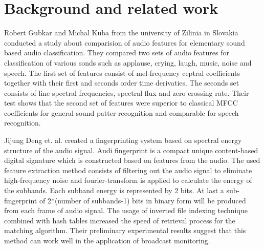 \section{Background and related work}
Robert Gubkar and Michal Kuba \cite{6566278}  from the university of Zilinia in Slovakia
conducted a study about comparision of audio features for elementary sound
based audio classification. They compared two sets of audio features for classification
of various sonds such as applause, crying, laugh, music, noise and speech.
The first set of features consist of mel-frequency ceptral coefficients together with
their first and seconds order time derivaties. The seconds set consists of line
spectral frequencies, spectral flux and zero crossing rate. Their test shows that
the second set of features were superior to classical MFCC coefficients for general
sound patter recognition and comparable for speech recognition.

Jijung Deng et. al.\cite{6138136} created a fingerprinting system based on spectral energy
structure of the audio signal. Audi fingerprint is a compact unique content-based
digital signature which is constructed based on features from the audio.
The used feature extraction method consists of filtering out the audio signal
to eliminate high-frequency noise and fourier-transform is applied to calculate
the energy of the subbands. Each subband energy is represented by 2 bits.
At last a sub-fingerprint of 2*(number of subbands-1) bits in binary form will
be produced from each frame of audio signal. The usage of inverted file
indexing technique combined with hash tables increased the speed of retrieval
process for the matching algorithm. Their preliminary experimental results
suggest that this method can work well
in the application of broadcast monitoring.
